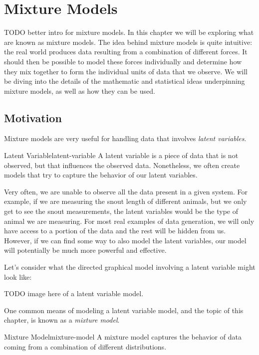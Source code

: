 \chapter{Mixture Models}
TODO better intro for mixture models.
In this chapter we will be exploring what are known as mixture models. The idea behind mixture models is quite intuitive: the real world produces data resulting from a combination of different forces. It should then be possible to model these forces individually and determine how they mix together to form the individual units of data that we observe. We will be diving into the details of the mathematic and statistical ideas underpinning mixture models, as well as how they can be used.

\section{Motivation}
Mixture models are very useful for handling data that involves \textit{latent variables}.

\begin{definition}{Latent Variable}{latent-variable}
    A latent variable is a piece of data that is not observed, but that influences the observed data. Nonetheless, we often create models that try to capture the behavior of our latent variables.
\end{definition}

Very often, we are unable to observe all the data present in a given system. For example, if we are measuring the snout length of different animals, but we only get to see the snout measurements, the latent variables would be the type of animal we are measuring. For most real examples of data generation, we will only have access to a portion of the data and the rest will be hidden from us. However, if we can find some way to also model the latent variables, our model will potentially be much more powerful and effective.

Let's consider what the directed graphical model involving a latent variable might look like:

TODO image here of a latent variable model.

One common means of modeling a latent variable model, and the topic of this chapter, is known as a \textit{mixture model}.

\begin{definition}{Mixture Model}{mixture-model}
    A mixture model captures the behavior of data coming from a combination of different distributions.
\end{definition}

